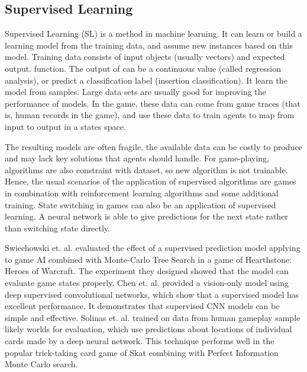 \documentclass[11pt,en]{elegantpaper}
\begin{document}
\subsection{Supervised Learning}
Supervised Learning (SL) is a method in machine learning. It can learn or build a learning model from the training data, and assume new instances based on this model\cite{Chen2017}. Training data consists of input objects (usually vectors) and expected output. function. The output of can be a continuous value (called regression analysis), or predict a classification label (insertion classification). It learn the model from samples. Large data sets are usually good for improving the performance of models. In the game, these data can come from game traces (that is, human records in the game), and use these data to train agents to map from input to output in a states space.

The resulting models are often fragile, the available data can be costly to produce and may lack key solutions that agents should handle. For game-playing, algorithms are also constraint with dataset, so new algorithm is not trainable. Hence, the usual scenarios of the application of supervised algorithms are games in combination with reinforcement learning algorithms and some additional training. State switching in games can also be an application of supervised learning. A neural network is able to give predictions for the next state rather than switching state directly.

Swiechowski et. al. \cite{a1} evaluated the effect of a supervised prediction model applying to game AI combined with Monte-Carlo Tree Search in a game of Hearthstone: Heroes of Warcraft. The experiment they designed showed that the model can evaluate game states properly. Chen et. al. \cite{a2} provided a vision-only model using deep supervised convolutional networks, which show that a supervised model has excellent performance. It demonstrates that supervised CNN models can be simple and effective. Solinas et. al. \cite{a3} trained on data from human gameplay sample likely worlds for evaluation, which use predictions about locations of individual cards made by a deep neural network. This technique performs well in the popular trick-taking card game of Skat combining with Perfect Information Monte Carlo search\cite{Gaina2017}.
\end{document}
